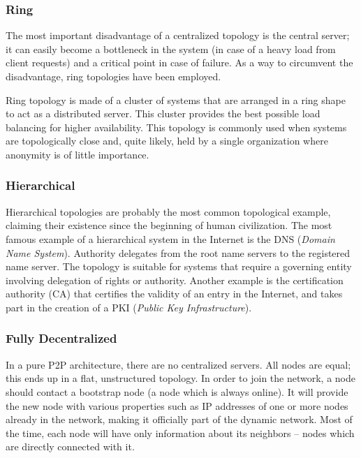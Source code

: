 \subsubsection{Ring}

The most important disadvantage of a centralized topology is the central
server; it can easily become a bottleneck in the system (in case of a heavy
load from client requests) and a critical point in case of failure. As a way
to circumvent the disadvantage, ring topologies have been employed.

Ring topology is made of a cluster of systems that are arranged in a ring shape
to act as a distributed server. This cluster provides the best possible load
balancing for higher availability. This topology is commonly used when systems
are topologically close and, quite likely, held by a single organization where
anonymity is of little importance.

\subsubsection{Hierarchical}

Hierarchical topologies are probably the most common topological example,
claiming their existence since the beginning of human civilization. The most
famous example of a hierarchical system in the Internet is the DNS
(\textit{Domain Name System}). Authority delegates from the root name servers
to the registered name server. The topology is suitable for systems that
require a governing entity involving delegation of rights or authority.
Another example is the certification authority (CA) that certifies the
validity of an entry in the Internet, and takes part in the creation of a PKI
(\textit{Public Key Infrastructure}).

\subsubsection{Fully Decentralized}

In a pure P2P architecture, there are no centralized servers. All nodes are
equal; this ends up in a flat, unstructured topology. In order to join the
network, a node should contact a bootstrap node (a node which is always online).
It will provide the new node with various properties such as IP addresses of
one or more nodes already in the network, making it officially part of the
dynamic network. Most of the time, each node will have only information about
its neighbors -- nodes which are directly connected with it.

